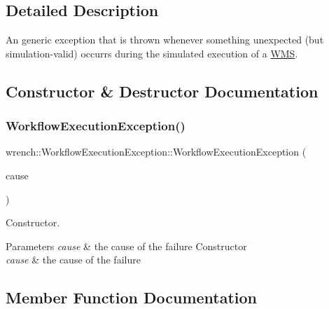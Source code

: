 \subsection{Detailed Description}
An generic exception that is thrown whenever something unexpected (but simulation-\/valid) occurrs during the simulated execution of a \hyperlink{classwrench_1_1_w_m_s}{W\+MS}. 

\subsection{Constructor \& Destructor Documentation}
\mbox{\label{classwrench_1_1_workflow_execution_exception_a7b1eef40dc7846d0606ac66641379ced}} 
\subsubsection{\texorpdfstring{Workflow\+Execution\+Exception()}{WorkflowExecutionException()}}
{\footnotesize\ttfamily wrench\+::\+Workflow\+Execution\+Exception\+::\+Workflow\+Execution\+Exception (\begin{DoxyParamCaption}\item[{std\+::shared\+\_\+ptr$<$ \hyperlink{classwrench_1_1_failure_cause}{Failure\+Cause} $>$}]{cause }\end{DoxyParamCaption})\hspace{0.3cm}{\ttfamily [inline]}}



Constructor. 


\begin{DoxyParams}{Parameters}
{\em cause} & the cause of the failure Constructor \\
\hline
{\em cause} & the cause of the failure \\
\hline
\end{DoxyParams}


\subsection{Member Function Documentation}
\mbox{\label{classwrench_1_1_workflow_execution_exception_a45fbbd2bc144da41f1fd09efcdaa2481}} 
